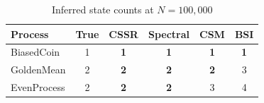 \begin{table}[h]
\centering
\caption{Inferred state counts at $N = 100{,}000$}
\label{tab:state-counts}
\begin{tabular}{lccccc}
\toprule
Process & True & CSSR & Spectral & CSM & BSI \\
\midrule
BiasedCoin & 1 & \textbf{1} & \textbf{1} & \textbf{1} & \textbf{1} \\
GoldenMean & 2 & \textbf{2} & \textbf{2} & \textbf{2} & 3 \\
EvenProcess & 2 & \textbf{2} & \textbf{2} & 3 & 4 \\
\bottomrule
\end{tabular}
\end{table}
